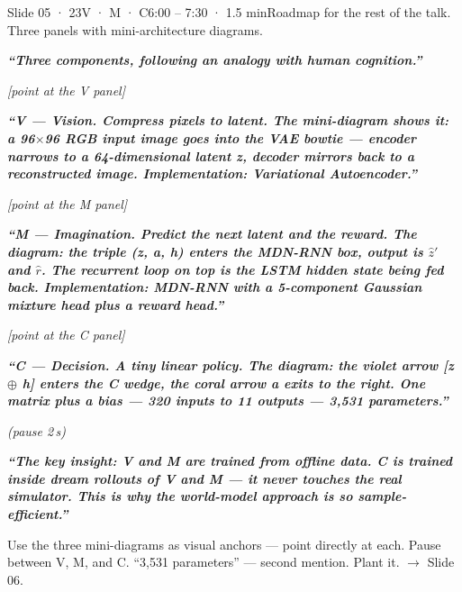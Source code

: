 \documentclass[11pt,a4paper]{article}
\newcommand{\say}[1]{%
    \par\vspace{0.3em}%
    \begingroup
    \leftskip=12pt
    \rightskip=8pt
    \color{thStrong}%
    \itshape\textbf{“#1”}%
    \par
    \endgroup
    \vspace{0.2em}
}
\newcommand{\beat}[1][2]{%
    \par\textcolor{thMuted}{\small\textit{(pause #1\,s)}}\par
    \vspace{0.2em}
}
\newcommand{\stage}[1]{%
    \par\textcolor{thMuted}{\small\textit{[#1]}}\par
    \vspace{0.2em}
}
\newcommand{\emphw}[1]{\textbf{\textcolor{thAmber}{#1}}}
\newcommand{\emphteal}[1]{\textbf{\textcolor{thTeal}{#1}}}
\newcommand{\emphviolet}[1]{\textbf{\textcolor{thViolet}{#1}}}
\begin{document}
\begin{slide}{Slide 05 · 23}{V · M · C}{6:00 – 7:30 · 1.5 min}{Roadmap for the rest of the talk. Three panels with mini-architecture diagrams.}
\say{Three components, following an analogy with human cognition.}

\stage{point at the V panel}

\say{\emphw{V — Vision.} Compress pixels to latent. The mini-diagram shows it: a 96$\times$96 RGB input image goes into the \textbf{VAE bowtie} — encoder narrows to a 64-dimensional latent z, decoder mirrors back to a reconstructed image. Implementation: \textbf{Variational Autoencoder}.}

\stage{point at the M panel}

\say{\emphviolet{M — Imagination.} Predict the next latent and the reward. The diagram: the triple (z, a, h) enters the \textbf{MDN-RNN box}, output is $\hat{z}'$ and $\hat{r}$. The recurrent loop on top is the LSTM hidden state being fed back. Implementation: \textbf{MDN-RNN with a 5-component Gaussian mixture head plus a reward head}.}

\stage{point at the C panel}

\say{\emphteal{C — Decision.} A tiny linear policy. The diagram: the violet arrow [z $\oplus$ h] enters the \textbf{C wedge}, the coral arrow a exits to the right. \textbf{One matrix plus a bias — 320 inputs to 11 outputs — 3{,}531 parameters.}}

\beat
\say{The key insight: V and M are trained from offline data. \emphw{C is trained inside dream rollouts of V and M} — it never touches the real simulator. This is why the world-model approach is so sample-efficient.}

\begin{stagebox}
Use the three mini-diagrams as visual anchors — point directly at each. Pause between V, M, and C. ``3,531 parameters'' — second mention. Plant it. $\rightarrow$ Slide 06.
\end{stagebox}
\end{slide}
\end{document}
